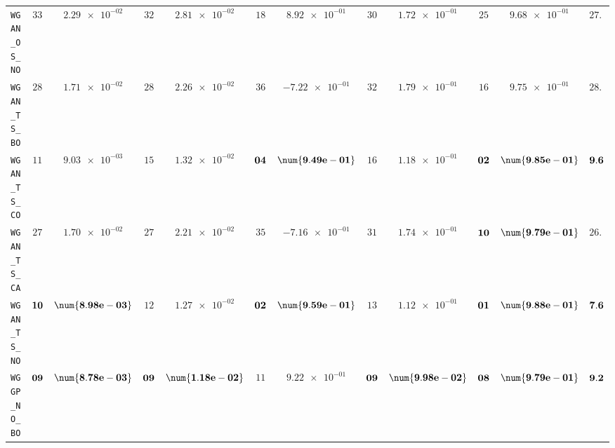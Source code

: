 \begin{table}[H]
\begin{tabularx}{\textwidth}{l||cC|cC|cC|cC|cC||c}
		\texttt{WGAN\_OS\_NO} & $ 33$ & $ \num{2.29e-02}$ & $ 32$ & $ \num{2.81e-02}$ & $ 18$ & $ \num{8.92e-01}$ & $ 30$ & $ \num{1.72e-01}$ & $ 25$ & $ \num{9.68e-01}$ & $ 27.6$  \\
		\texttt{WGAN\_TS\_BO} & $ 28$ & $ \num{1.71e-02}$ & $ 28$ & $ \num{2.26e-02}$ & $ 36$ & $ \num{-7.22e-01}$ & $ 32$ & $ \num{1.79e-01}$ & $ 16$ & $ \num{9.75e-01}$ & $ 28.0$  \\
		\texttt{WGAN\_TS\_CO} & $ 11$ & $ \num{9.03e-03}$ & $ 15$ & $ \num{1.32e-02}$ & $\bf 04$ & $\bf \num{9.49e-01}$ & $ 16$ & $ \num{1.18e-01}$ & $\bf 02$ & $\bf \num{9.85e-01}$ & $\bf 9.6$  \\
		\texttt{WGAN\_TS\_CA} & $ 27$ & $ \num{1.70e-02}$ & $ 27$ & $ \num{2.21e-02}$ & $ 35$ & $ \num{-7.16e-01}$ & $ 31$ & $ \num{1.74e-01}$ & $\bf 10$ & $\bf \num{9.79e-01}$ & $ 26.0$  \\
		\texttt{WGAN\_TS\_NO} & $\bf 10$ & $\bf \num{8.98e-03}$ & $ 12$ & $ \num{1.27e-02}$ & $\bf 02$ & $\bf \num{9.59e-01}$ & $ 13$ & $ \num{1.12e-01}$ & $\bf 01$ & $\bf \num{9.88e-01}$ & $\bf 7.6$  \\ \hline
		\texttt{WGGP\_NO\_BO} & $\bf 09$ & $\bf \num{8.78e-03}$ & $\bf 09$ & $\bf \num{1.18e-02}$ & $ 11$ & $ \num{9.22e-01}$ & $\bf 09$ & $\bf \num{9.98e-02}$ & $\bf 08$ & $\bf \num{9.79e-01}$ & $\bf 9.2$  \\

\end{tabularx}
\end{table}
